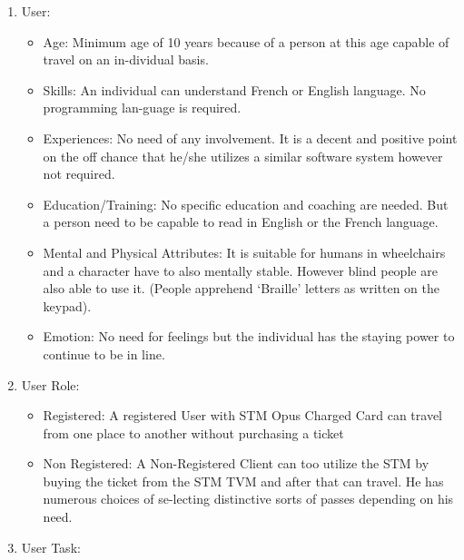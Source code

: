 \documentclass[11pt,oneside]{book}
\begin{document}
\begin{enumerate}
    \item User:
        \begin{itemize}
        
        
        
         \item	Age: Minimum age of 10 years because of a person at this age capable of travel on an in-dividual basis.
 \item Skills: An individual can understand French or English language. No programming lan-guage is required. 
 \item Experiences: No need of any involvement. It is a decent and positive point on the off chance that he/she utilizes a similar software system however not required. 
 \item Education/Training: No specific education and coaching are needed. But a person need to be capable to read in English or the French language.
 \item Mental and Physical Attributes: It is suitable for humans in wheelchairs and a character have to also mentally stable. However blind people are also able to use it. (People apprehend ‘Braille’ letters as written on the keypad).
 \item Emotion: No need for feelings but the individual has the staying power to continue to be in line.
 
        \end{itemize}
    
    
    \item User Role:
        \begin{itemize}
        \item Registered: A registered User with STM Opus Charged Card can travel from one place to another without purchasing a ticket 
\item Non Registered: A Non-Registered Client can too utilize the STM by buying the ticket from the STM TVM and after that can travel. He has numerous choices of se-lecting distinctive sorts of passes depending on his need.

        
        
        
 
        \end{itemize}
    
    
  
    \item User Task:
        \begin{itemize}
        

\end{itemize}
\end{enumerate}
\end{document}
